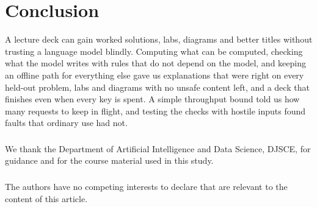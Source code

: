 \documentclass[runningheads]{llncs}
\begin{document}
\section{Conclusion}
A lecture deck can gain worked solutions, labs, diagrams and better titles without trusting a language model blindly. Computing
what can be computed, checking what the model writes with rules that do not depend on the model, and keeping an offline path for
everything else gave us explanations that were right on every held-out problem, labs and diagrams with no unsafe content left,
and a deck that finishes even when every key is spent. A simple throughput bound told us how many requests to keep in flight,
and testing the checks with hostile inputs found faults that ordinary use had not.

\begin{credits}
\subsubsection{\ackname} We thank the Department of Artificial Intelligence and Data Science, DJSCE, for guidance and for the
course material used in this study.
\subsubsection{\discintname} The authors have no competing interests to declare that are relevant to the content of this
article.
\end{credits}



\end{document}
